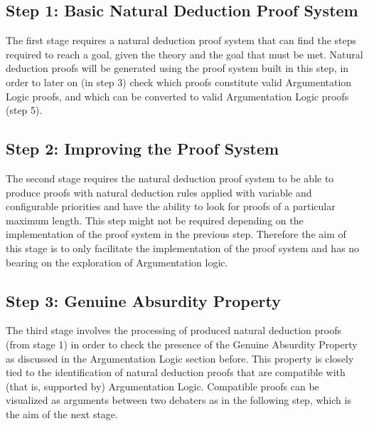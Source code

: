 \documentclass[11pt,twoside,a4paper]{report}
\begin{document}
\subsection{Step 1: Basic Natural Deduction Proof System}
The first stage requires a natural deduction proof system that can find the steps required to reach a goal, given the theory and the goal that must be met. Natural deduction proofs will be generated using the proof system built in this step, in order to later on (in step 3) check which proofs constitute valid Argumentation Logic proofs, and which can be converted to valid Argumentation Logic proofs (step 5).

\subsection{Step 2: Improving the Proof System}
The second stage requires the natural deduction proof system to be able to produce proofs with natural deduction rules applied with variable and configurable priorities and have the ability to look for proofs of a particular maximum length. This step might not be required depending on the implementation of the proof system in the previous step. Therefore the aim of this stage is to only facilitate the implementation of the proof system and has no bearing on the exploration of Argumentation logic.

\subsection{Step 3: Genuine Absurdity Property}
The third stage involves the processing of produced natural deduction proofs (from stage 1) in order to check the presence of the Genuine Absurdity Property as discussed in the Argumentation Logic section before. This property is closely tied to the identification of natural deduction proofs that are compatible with (that is, supported by) Argumentation Logic. Compatible proofs can be visualized as arguments between two debaters as in the following step, which is the aim of the next stage.
\end{document}
